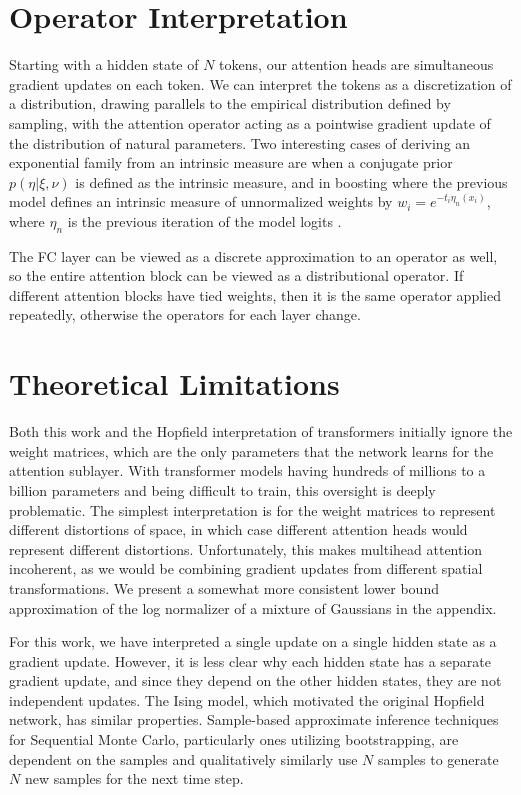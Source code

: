 \documentclass{article}
\begin{document}
\section{Operator Interpretation}
\label{operator interpretation}

Starting with a hidden state of $N$ tokens, our attention heads are simultaneous gradient updates on each token. 
We can interpret the tokens as a discretization of a distribution, drawing parallels to the empirical distribution defined by sampling, with the attention operator acting as a pointwise gradient update of the distribution of natural parameters.
Two interesting cases of deriving an exponential family from an intrinsic measure are when a conjugate prior $ p( \eta \vert \xi, \nu )$ is defined as the intrinsic measure, and in boosting where the previous model defines an intrinsic measure of unnormalized weights by $w_i = e^{ - t_i \eta_n(x_i) } $, where $\eta_n$ is the previous iteration of the model logits \cite{collins00logistic}.

The FC layer can be viewed as a discrete approximation to an operator as well, so the entire attention block can be viewed as a distributional operator.  If different attention blocks have tied weights, then it is the same operator applied repeatedly, otherwise the operators for each layer change.

\section{Theoretical Limitations}
\label{limitations}
Both this work and the Hopfield interpretation of transformers initially ignore the weight matrices, which are the only parameters that the network learns for the attention sublayer. 
With transformer models having hundreds of millions to a billion parameters and being difficult to train, this oversight is deeply problematic. 
The simplest interpretation is for the weight matrices to represent different distortions of space, in which case different attention heads would represent different distortions.
Unfortunately, this makes multihead attention incoherent, as we would be combining gradient updates from different spatial transformations. We present a somewhat more consistent lower bound approximation of the log normalizer of a mixture of Gaussians in the appendix.

For this work, we have interpreted a single update on a single hidden state as a gradient update. 
However, it is less clear why each hidden state has a separate gradient update, and since they depend on the other hidden states, they are not independent updates. The Ising model, which motivated the original Hopfield network, has similar properties. Sample-based approximate inference techniques for Sequential Monte Carlo, particularly ones utilizing bootstrapping, are dependent on the samples and qualitatively similarly use $N$ samples to generate $N$ new samples for the next time step.
\end{document}
